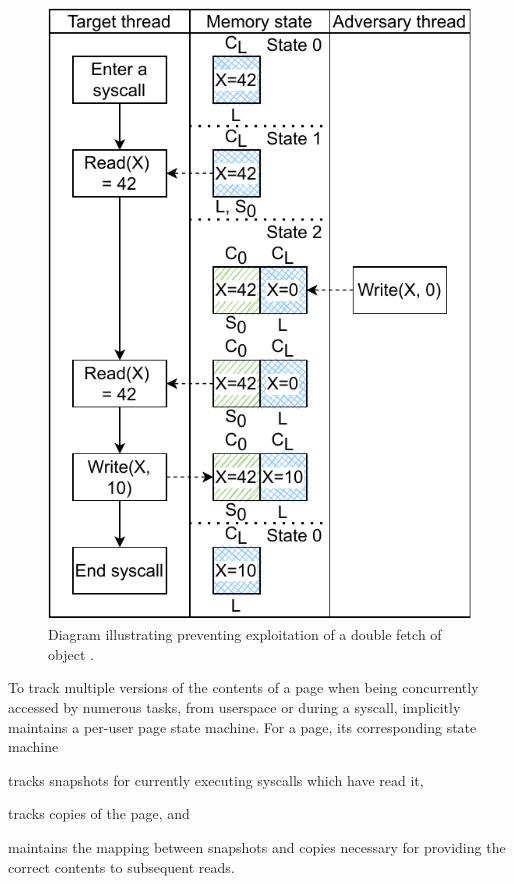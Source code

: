 \documentclass[letterpaper,twocolumn,10pt]{article}
\begin{document}
\begin{figure}[h]
  \centering
  \includegraphics[width=0.85\linewidth]{img/doublefetch_midas.pdf}
  \caption{Diagram illustrating \midas preventing exploitation of a
  double fetch of object .}
  \label{fig:doublefetch_midas}
\end{figure}

To track multiple versions of the contents of a page when being concurrently
accessed by numerous tasks, from userspace or during a syscall,
\midas implicitly maintains a per-user page state machine.
For a page, its corresponding state machine
\begin{inparaenum}
  \item tracks snapshots for currently executing syscalls which have read it,
  \item tracks copies of the page, and
  \item maintains the mapping between snapshots and copies necessary for providing
  the correct contents to subsequent reads. %
\end{inparaenum}
\end{document}
